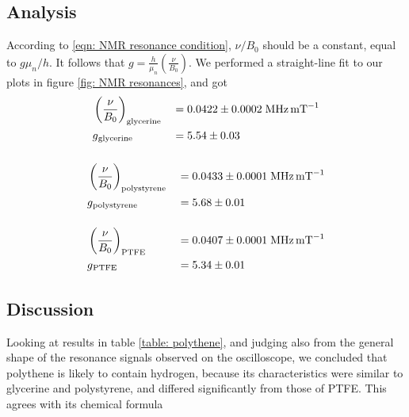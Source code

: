 \documentclass[a4paper]{jpconf}
\numberwithin{equation}{section}
\begin{document}
\subsection{Analysis}
According to \eqref{eqn: NMR resonance condition}, $\nu / B_0$ should be a constant, equal to $g \mu_n/h$. It follows that $ g = \frac{h}{\mu_n} \left( \frac{\nu}{B_0} \right)$. We performed a straight-line fit to our plots in figure \ref{fig: NMR resonances}, and got
\begin{alignat*}{2}
    &\left( \frac{\nu}{B_0} \right)_{\text{glycerine}} &&= 0.0422 \pm 0.0002 \; \si{\mega\hertz\per\milli\tesla} \\
	&g\textsubscript{glycerine} &&= 5.54 \pm 0.03 \\[12pt]
\end{alignat*}
\begin{alignat*}{2}
    &\left( \frac{\nu}{B_0} \right)_{\text{polystyrene}} &&= 0.0433 \pm 0.0001 \; \si{\mega\hertz\per\milli\tesla} \\
	&g\textsubscript{polystyrene} &&= 5.68 \pm 0.01 \\[12pt]
	&\left( \frac{\nu}{B_0} \right)_{\text{PTFE}} &&= 0.0407 \pm 0.0001 \; \si{\mega\hertz\per\milli\tesla} \\
	&g\textsubscript{PTFE} &&= 5.34 \pm 0.01 \\
\end{alignat*}

\subsection{Discussion}

Looking at results in table \ref{table: polythene}, and judging also from the general shape of the resonance signals observed on the oscilloscope, we concluded that polythene is likely to contain hydrogen, because its characteristics were similar to glycerine and polystyrene, and differed significantly from those of PTFE. This agrees with its chemical formula

\vspace{10pt}
\newcommand\setpolymerdelim[2]{\def\delimleft{#1}\def\delimright{#2}}
\def\makebraces[#1,#2]#3#4#5{%
	\edef\delimhalfdim{\the\dimexpr(#1+#2)/2}%
	\edef\delimvshift{\the\dimexpr(#1-#2)/2}%
	\chemmove{%
		\node[at=(#4),yshift=(\delimvshift)]
		{$\left\delimleft\vrule height\delimhalfdim depth\delimhalfdim
			width0pt\right.$};%
		\node[at=(#5),yshift=(\delimvshift)]
		{$\left.\vrule height\delimhalfdim depth\delimhalfdim
			width0pt\right\delimright_{\rlap{$\scriptstyle#3$}}$};}}
\setpolymerdelim()
\end{document}
